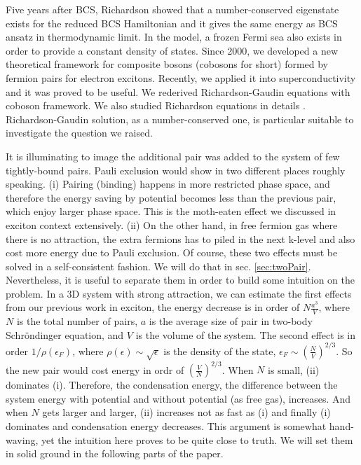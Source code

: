 \documentclass[3p,twocolumn]{elsarticle}
\begin{document}
Five years after BCS, Richardson showed that a number-conserved eigenstate exists for the reduced BCS Hamiltonian and it gives the same energy as BCS ansatz in thermodynamic limit\cite{Richardson1,Richardson2,Richardson3,Richardson1968,gaudin}.  In the model, a frozen Fermi sea also exists in order to provide a constant density of states.  Since 2000, we developed a new theoretical framework for composite bosons (cobosons for short) formed by fermion pairs for electron excitons\cite{CobosonPhysicsReports}.   Recently, we applied it into superconductivity and it was proved to be useful.  We rederived Richardson-Gaudin equations with coboson framework\cite{CobosonBcsRich}. We also studied Richardson equations in details \cite{CombescotCooper,combescotBCS}.  Richardson-Gaudin solution, as a number-conserved one, is  particular suitable to investigate the question we raised.  

It is illuminating to image the additional pair was added to the system of few tightly-bound pairs.   Pauli exclusion would show in two different places roughly speaking.  (i) Pairing (binding) happens in more restricted phase space, and therefore the energy saving by potential becomes less than the previous pair, which enjoy larger phase space.  This is the moth-eaten effect we discussed in exciton context extensively\cite{CobosonPhysicsReports}.  (ii) On the other hand, in free fermion gas where there is no attraction, the extra fermions has to piled in the next k-level and also cost more energy due to Pauli exclusion.  Of course, these two effects must be solved in a self-consistent fashion.  We will do that in sec. \ref{sec:twoPair}.  Nevertheless, it is useful to separate them in order to build some intuition on the problem.  In a 3D system with strong attraction, we can estimate the first effects from our previous work in exciton, the energy decrease is in order of $N\frac{a^3}{V}$, where $N$ is the total number of pairs, $a$ is the average size of pair in two-body Schr\"{o}ndinger equation, and $V$ is the volume of the system. The second effect is in order $1/\rho(\epsilon_F)$, where $\rho(\epsilon)\sim\sqrt{\epsilon}$ is the density of the state, $\epsilon_F\sim\left(\frac{N}{V}\right)^{2/3}$. So the new pair would cost energy in ordr of $\left(\frac{V}{N}\right)^{2/3}$. When $N$ is small, (ii) dominates (i). Therefore, the condensation energy, the difference between the system energy with potential and without potential (as free gas), increases.  And when $N$ gets larger and larger, (ii) increases not as fast as (i) and finally (i) dominates and condensation energy decreases.    This argument is somewhat hand-waving, yet the intuition here proves to be quite close to truth.  We will set them in solid ground in the following parts of the paper. 
\end{document}
